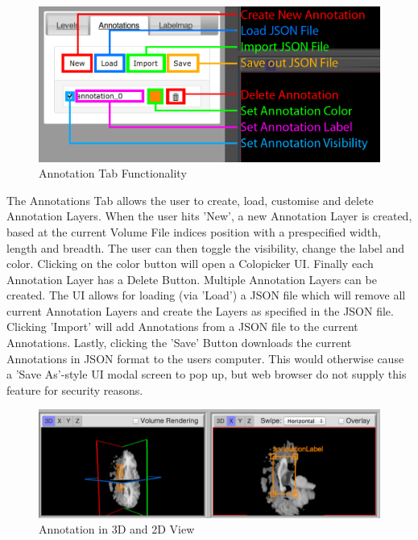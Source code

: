 \documentclass[a4paper,11pt,twoside]{article}
\begin{document}
\begin{figure}[ht!]
\centering
\includegraphics[width=140mm]{graphics/features_05.png}
\caption{Annotation Tab Functionality}
\label{fig:UIdesign1}
\end{figure}

The Annotations Tab allows the user to create, load, customise and delete Annotation Layers. When the user hits 'New', a new Annotation Layer is created, based at the current Volume File indices position with a prespecified width, length and breadth. The user can then toggle the visibility, change the label and color. Clicking on the color button will open a Colopicker UI. Finally each Annotation Layer has a Delete Button. Multiple Annotation Layers can be created. The UI allows for loading (via 'Load') a JSON file which will remove all current Annotation Layers and create the Layers as specified in the JSON file. Clicking 'Import' will add Annotations from a JSON file to the current Annotations. Lastly, clicking the 'Save' Button downloads the current Annotations in JSON format to the users computer. This would otherwise cause a 'Save As'-style UI modal screen to pop up, but web browser do not supply this feature for security reasons.



\begin{figure}[ht!]
\centering
\includegraphics[width=170mm]{graphics/AnnotationFinal_01.png}
\caption{Annotation in 3D and 2D View}
\label{fig:UIdesign1}
\end{figure}
\end{document}
